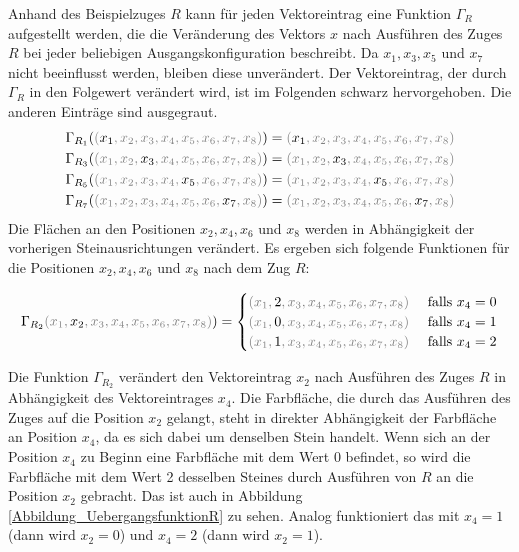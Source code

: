 \documentclass[12pt,a4paper, usenames, dvipsnames]{article}
\theoremstyle{mystyle}
\theoremstyle{definition}
\begin{document}
Anhand des Beispielzuges $R$ kann für jeden Vektoreintrag eine Funktion $\Gamma_R$ aufgestellt werden, die die Veränderung des Vektors $x$ nach Ausführen des Zuges $R$ bei jeder beliebigen Ausgangskonfiguration beschreibt. Da $x_1, x_3, x_5$ und $x_7$ nicht beeinflusst werden, bleiben diese unverändert. Der Vektoreintrag, der durch $\Gamma_R$ in den Folgewert verändert wird, ist im Folgenden schwarz hervorgehoben. Die anderen Einträge sind ausgegraut.
\begin{align*}
& \Gamma_{R_1}(\textcolor{gray}{(\textcolor{black}{x_1}, x_2, x_3, x_4, x_5, x_6, x_7, x_8  )})=\textcolor{gray}{(\textcolor{black}{x_1}, x_2, x_3, x_4, x_5, x_6, x_7, x_8  )} \\
& \Gamma_{R_3}(\textcolor{gray}{(x_1, x_2, \textcolor{black}{x_3}, x_4, x_5, x_6, x_7, x_8  )})=\textcolor{gray}{(x_1, x_2, \textcolor{black}{x_3}, x_4, x_5, x_6, x_7, x_8  )} \\
& \Gamma_{R_5}(\textcolor{gray}{(x_1, x_2, x_3, x_4, \textcolor{black}{x_5}, x_6, x_7, x_8  )})=\textcolor{gray}{(x_1, x_2, x_3, x_4, \textcolor{black}{x_5}, x_6, x_7, x_8  )}\\
& \Gamma_{R_7}(\textcolor{gray}{(x_1, x_2, x_3, x_4, x_5, x_6,\textcolor{black}{x_7}, x_8  )})=\textcolor{gray}{(x_1, x_2, x_3, x_4, x_5, x_6, \textcolor{black}{x_7}, x_8  )} 
\end{align*}
Die Flächen an den Positionen $x_2, x_4, x_6$ und $x_8$ werden in Abhängigkeit der vorherigen Steinausrichtungen verändert. Es ergeben sich folgende Funktionen für die Positionen $x_2, x_4, x_6$ und $x_8$ nach dem Zug $R$: 


\begin{align*}
\Gamma_{R_2}\textcolor{gray}{(x_1, \textcolor{black}{x_2}, x_3, x_4, x_5, x_6, x_7, x_8  )})= \begin{cases}
\textcolor{gray}{(x_1, \textcolor{black}{2}, x_3, x_4, x_5, x_6, x_7, x_8  )} & \ \text{falls } x_4 = 0 \\ 
\textcolor{gray}{(x_1, \textcolor{black}{0}, x_3, x_4, x_5, x_6, x_7, x_8  )} & \ \text{falls } x_4 = 1 \\
\textcolor{gray}{(x_1, \textcolor{black}{1}, x_3, x_4, x_5, x_6, x_7, x_8  )} & \ \text{falls } x_4 = 2 
\end{cases}
\end{align*}

Die Funktion $\Gamma_{R_2}$ verändert den Vektoreintrag $x_2$ nach Ausführen des Zuges $R$ in Abhängigkeit des Vektoreintrages $x_4$. Die Farbfläche, die durch das Ausführen des Zuges auf die Position $x_2$ gelangt, steht in direkter Abhängigkeit der Farbfläche an Position $x_4$, da es sich dabei um denselben Stein handelt. Wenn sich an der Position $x_4$ zu Beginn eine Farbfläche mit dem Wert 0 befindet, so wird die Farbfläche mit dem Wert 2 desselben Steines durch Ausführen von $R$ an die Position $x_2$ gebracht. Das ist auch in Abbildung \ref{Abbildung_UebergangsfunktionR} zu sehen. Analog funktioniert das mit $x_4 = 1$ (dann wird $x_2 = 0$) und $x_4=2$ (dann wird $x_2 = 1$). 
\end{document}
